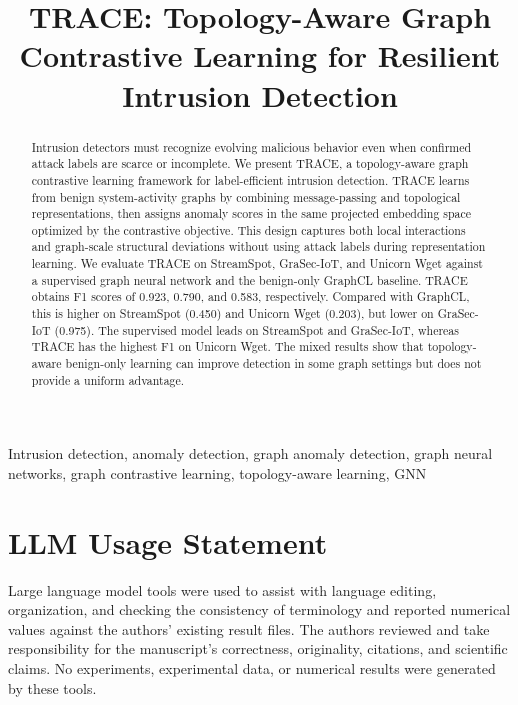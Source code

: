 \documentclass[conference,compsoc]{IEEEtran}
\newcommand{\sysname}{TRACE\xspace}
\begin{document}
\title{\sysname: Topology-Aware Graph Contrastive Learning for Resilient Intrusion Detection}

\maketitle

\begin{abstract}
Intrusion detectors must recognize evolving malicious behavior even when confirmed attack labels are scarce or incomplete. We present \sysname, a topology-aware graph contrastive learning framework for label-efficient intrusion detection. \sysname learns from benign system-activity graphs by combining message-passing and topological representations, then assigns anomaly scores in the same projected embedding space optimized by the contrastive objective. This design captures both local interactions and graph-scale structural deviations without using attack labels during representation learning. We evaluate \sysname on StreamSpot, GraSec-IoT, and Unicorn Wget against a supervised graph neural network and the benign-only GraphCL baseline. \sysname obtains F1 scores of 0.923, 0.790, and 0.583, respectively. Compared with GraphCL, this is higher on StreamSpot (0.450) and Unicorn Wget (0.203), but lower on GraSec-IoT (0.975). The supervised model leads on StreamSpot and GraSec-IoT, whereas \sysname has the highest F1 on Unicorn Wget. The mixed results show that topology-aware benign-only learning can improve detection in some graph settings but does not provide a uniform advantage.
\end{abstract}

\begin{IEEEkeywords}
Intrusion detection, anomaly detection, graph anomaly detection, graph neural networks, graph contrastive learning, topology-aware learning, GNN
\end{IEEEkeywords}










\section*{LLM Usage Statement}
Large language model tools were used to assist with language editing, organization, and checking the consistency of terminology and reported numerical values against the authors' existing result files. The authors reviewed and take responsibility for the manuscript's correctness, originality, citations, and scientific claims. No experiments, experimental data, or numerical results were generated by these tools.



\end{document}
